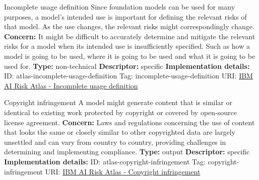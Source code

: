 \documentclass[a4paper,12pt]{article}
\begin{document}
\begin{definitionbox}{Incomplete usage definition}
Since foundation models can be used for many purposes, a model's intended use is important for defining the relevant risks of that model. As the use changes, the relevant risks might correspondingly change.\newline\newline
\textbf{Concern: }It might be difficult to accurately determine and mitigate the relevant risks for a model when its intended use is insufficiently specified. Such as how a model is going to be used, where it is going to be used and what it is going to be used for.\newline\newline
\textbf{Type: }non-technical\newline
\textbf{Descriptor: }specific \newline\newline
\textbf{Implementation details: } \newline
ID: atlas-incomplete-usage-definition \newline
Tag: incomplete-usage-definition \newline
URI:  \href{https://www.ibm.com/docs/en/watsonx/saas?topic=SSYOK8/wsj/ai-risk-atlas/incomplete-usage-definition.html}{IBM AI Risk Atlas - Incomplete usage definition}\newline
\end{definitionbox}
\begin{definitionbox}{Copyright infringement}
A model might generate content that is similar or identical to existing work protected by copyright or covered by open-source license agreement.\newline\newline
\textbf{Concern: }Laws and regulations concerning the use of content that looks the same or closely similar to other copyrighted data are largely unsettled and can vary from country to country, providing challenges in determining and implementing compliance.\newline\newline
\textbf{Type: }output\newline
\textbf{Descriptor: }specific \newline\newline
\textbf{Implementation details: } \newline
ID: atlas-copyright-infringement \newline
Tag: copyright-infringement \newline
URI:  \href{https://www.ibm.com/docs/en/watsonx/saas?topic=SSYOK8/wsj/ai-risk-atlas/copyright-infringement.html}{IBM AI Risk Atlas - Copyright infringement}\newline
\end{definitionbox}
\end{document}
